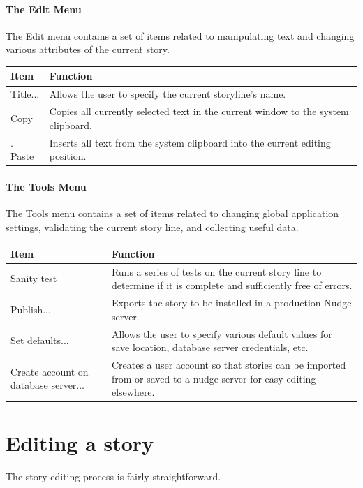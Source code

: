 \documentclass[12pt,letterpaper]{article}
\begin{document}
\paragraph{The Edit Menu}
The Edit menu contains a set of items related to manipulating text and changing various attributes of the current story.

\begin{center}
    \begin{tabular}{l|p{4in}}
    Item & Function\\ \hline \hline
    Title... & Allows the user to specify the current storyline's name.\\ \hline
    Copy & Copies all currently selected text in the current window to the system clipboard.\\ \hline.
    Paste & Inserts all text from the system clipboard into the current editing position.\\ \hline
    \end{tabular}
\end{center}

\paragraph{The Tools Menu}
The Tools menu contains a set of items related to changing global application settings, validating the current story line, and collecting useful data.

\begin{center}
    \begin{tabular}{l|p{4in}}
    Item & Function\\ \hline \hline
    Sanity test & Runs a series of tests on the current story line to determine if it is complete and sufficiently free of errors.\\ \hline
    Publish... & Exports the story to be installed in a production Nudge server.\\ \hline
    Set defaults... & Allows the user to specify various default values for save location, database server credentials, etc.\\ \hline
    Create account on database server... & Creates a user account so that stories can be imported from or saved to a nudge server for easy editing elsewhere.\\ \hline
    \end{tabular}
\end{center}

\section{Editing a story}
The story editing process is fairly straightforward. 
\end{document}
